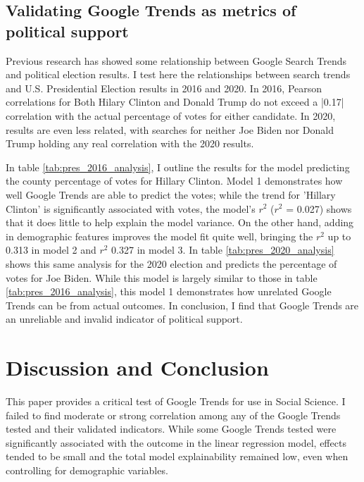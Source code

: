 

\subsection{Validating Google Trends as metrics of political support}

Previous research has showed some relationship between Google Search Trends and
political election results. I test here the relationships between search trends
and U.S. Presidential Election results in 2016 and 2020. In 2016, Pearson
correlations for Both Hilary Clinton and Donald Trump do not exceed a |0.17|
correlation with the actual percentage of votes for either candidate. In 2020,
results are even less related, with searches for neither Joe Biden nor Donald
Trump holding any real correlation with the 2020 results.

In table \ref{tab:pres_2016_analysis}, I outline the results for the model
predicting the county percentage of votes for Hillary Clinton. Model 1
demonstrates how well Google Trends are able to predict the votes; while the
trend for 'Hillary Clinton' is significantly associated with votes, the model's
$r^2$ ($r^2$ = 0.027) shows that it does little to help explain the model
variance. On the other hand, adding in demographic features improves the model
fit quite well, bringing the $r^2$ up to 0.313 in model 2 and $r^2$ 0.327 in
model 3. In table \ref{tab:pres_2020_analysis} shows this same analysis for the
2020 election and predicts the percentage of votes for Joe Biden. While this
model is largely similar to those in table \ref{tab:pres_2016_analysis}, this
model 1 demonstrates how unrelated Google Trends can be from actual outcomes. In
conclusion, I find that Google Trends are an unreliable and invalid indicator of
political support.




\section{Discussion and Conclusion}
This paper provides a critical test of Google Trends for use in Social Science. 
I failed to find moderate or strong correlation among any of the Google 
Trends tested and their validated indicators.
While some Google Trends tested were significantly associated with the outcome in the linear regression model,
effects tended to be small and the total model explainability remained low,
even when controlling for demographic variables.  

